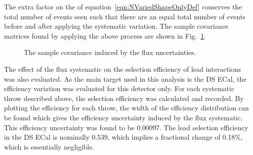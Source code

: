 The extra factor on the  of equation~\ref{eqn:NVariedShapeOnlyDef} conserves the total number of events seen such that there are an equal total number of events before and after applying the systematic variation.  The sample covariance matrices found by applying the above process are shown in Fig.~\ref{fig:FluxCovarianceMatrices}.
\begin{figure}%
  \centering
  \caption{The sample covariance induced by the flux uncertainties.}
  \label{fig:FluxCovarianceMatrices}
\end{figure}
\newline
\newline
The effect of the flux systematic on the selection efficiency of lead interactions was also evaluated.  As the main target used in this analysis is the DS ECal, the efficiency variation was evaluated for this detector only.  For each systematic throw described above, the selection efficiency was calculated and recorded.  By plotting the efficiency for each throw, the width of the efficiency distribution can be found which gives the efficiency uncertainty induced by the flux systematic.  This efficiency uncertainty was found to be 0.00097.  The lead selection efficiency in the DS ECal is nominally 0.539, which implies a fractional change of 0.18$\%$, which is essentially negligible.
